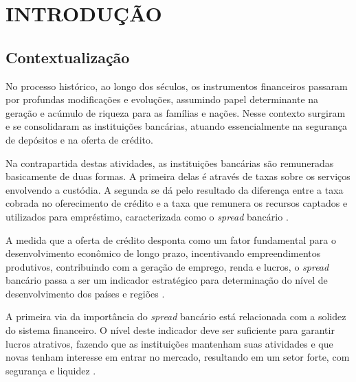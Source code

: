 \documentclass[12pt,12pt,openright,oneside,a4paper,chapter=TITLE,section=TITLE,subsection=TITLE,subsubsection=TITLE,english,french,spanish,portugues,sumario=tradicional]{abntex2}
\begin{document}




\textual
\pagestyle{simple}

\parindent 1.50cm

\DoubleSpacing

\chapter[INTRODUÇÃO]{INTRODUÇÃO}

\section{Contextualização}

No processo histórico, ao longo dos séculos, os instrumentos financeiros passaram por profundas modificações e evoluções, assumindo papel determinante na geração e acúmulo de riqueza para as famílias e nações. Nesse contexto surgiram e se consolidaram as instituições bancárias, atuando essencialmente na segurança de depósitos e na oferta de crédito.

Na contrapartida destas atividades, as instituições bancárias são remuneradas basicamente de duas formas. A primeira delas é através de taxas sobre os serviços envolvendo a custódia. A segunda se dá pelo resultado da diferença entre a taxa cobrada no oferecimento de crédito e a taxa que remunera os recursos captados e utilizados para empréstimo, caracterizada como o \emph{spread} bancário \cite{leite:1996} \cite{campello:2005} \cite{neves:2007}.

A medida que a oferta de crédito desponta como um fator fundamental para o desenvolvimento econômico de longo prazo, incentivando empreendimentos produtivos, contribuindo com a geração de emprego, renda e lucros, o \emph{spread} bancário passa a ser um indicador estratégico para determinação do nível de desenvolvimento dos países e regiões \cite{WB:2005} \cite{levine:1997}.

A primeira via da importância do \emph{spread} bancário está relacionada com a
solidez do sistema financeiro. O nível deste indicador deve ser suficiente para
garantir lucros atrativos, fazendo que as instituições mantenham suas
atividades e que novas tenham interesse em entrar no mercado, resultando em um
setor forte, com segurança e liquidez \cite{levine:1997} \cite{dantas:2012} \cite{leal:2006}.
\end{document}
